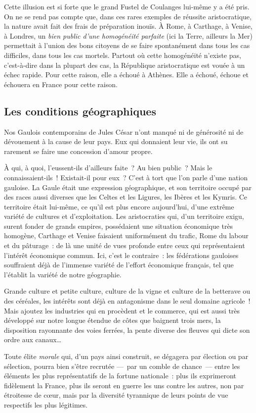\documentclass[french,twoside]{book} %
\newcommand{\astermono}{\medskip\centerline{\color{rubric}\large\selectfont{\syms ✻}}\medskip\par}%
\begin{document}
\noindent Cette illusion est si forte que le grand Fustel de Coulanges lui-même y a été pris. On ne se rend pas compte que, dans ces rares exemples de réussite aristocratique, la nature avait fait des frais de préparation inouïs. À Rome, à Carthage, à Venise, à Londres, un \emph{bien public d’une homogénéité parfaite} (ici la Terre, ailleurs la Mer) permettait à l’union des bons citoyens de se faire spontanément dans tous les cas difficiles, dans tous les cas mortels. Partout où cette homogénéité n’existe pas, c’est-à-dire dans la plupart des cas, la République aristocratique est vouée à un échec rapide. Pour cette raison, elle a échoué à Athènes. Elle a échoué, échoue et échouera en France pour cette raison.
\subsection[{Les conditions géographiques}]{Les conditions géographiques}
\noindent Nos Gaulois contemporains de Jules César n’ont manqué ni de générosité ni de dévouement à la cause de leur pays. Eux qui donnaient leur vie, ils ont su rarement se faire une concession d’amour propre.\par
À qui, à quoi, l’eussent-ils d’ailleurs faite ? Au bien public ? Mais le connaissaient-ils ! Existait-il pour eux ? C’est à tort que l’on parle d’une nation gauloise. La Gaule était une expression géographique, et son territoire occupé par des races aussi diverses que les Celtes et les Ligures, les Ibères et les Kymris. Ce territoire était lui-même, ce qu’il est plus encore aujourd’hui, d’une extrême variété de cultures et d’exploitation. Les aristocraties qui, d’un territoire exigu, surent fonder de grands empires, possédaient une situation économique très homogène, Carthage et Venise faisaient uniformément du trafic, Rome du labour et du pâturage : de là une unité de vues profonde entre ceux qui représentaient l’intérêt économique commun. Ici, c’est le contraire : les fédérations gauloises souffraient déjà de l’immense variété de l’effort économique français, tel que l’établit la variété de notre géographie.\par

\astermono

\noindent Grande culture et petite culture, culture de la vigne et culture de la betterave ou des céréales, les intérêts sont déjà en antagonisme dans le seul domaine agricole ! Mais ajoutez les industries qui en procèdent et le commerce, qui est aussi très développé sur notre longue étendue de côtes que baignent trois mers, la disposition rayonnante des voies ferrées, la pente diverse des fleuves qui dicte son ordre aux canaux…\par
Toute élite \emph{morale} qui, d’un pays ainsi construit, se dégagera par élection ou par sélection, pourra bien s’être recrutée — par un comble de chance — entre les éléments les plus représentatifs de la fortune nationale : plus ils exprimeront fidèlement la France, plus ils seront en guerre les uns contre les autres, non par étroitesse de cœur, mais par la diversité tyrannique de leurs points de vue respectifs les plus légitimes.\par
\end{document}
